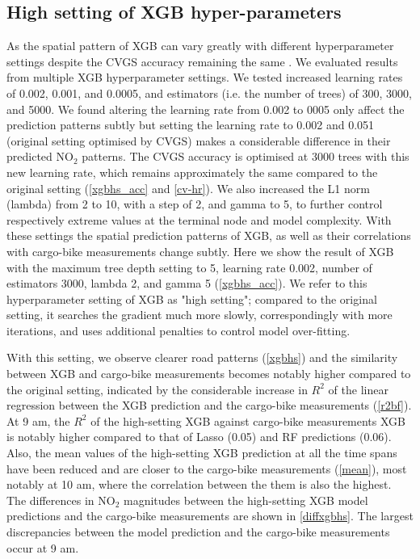 \documentclass{article}
\begin{document}
\subsection{High setting of XGB hyper-parameters}
As the spatial pattern of XGB can vary greatly with different hyperparameter settings despite the CVGS accuracy remaining the same \citep{luglobal}. We evaluated results from multiple XGB hyperparameter settings. We tested increased learning rates of 0.002, 0.001, and 0.0005, and estimators (i.e. the number of trees) of 300, 3000, and 5000. We found altering the learning rate from 0.002 to 0005 only affect the prediction patterns subtly but setting the learning rate to 0.002 and 0.051 (original setting optimised by CVGS) makes a considerable difference in their predicted NO$_2$ patterns. The CVGS accuracy is optimised at 3000 trees with this new learning rate, which remains approximately the same compared to the original setting (\cref{xgbhs_acc} and \cref{cv-hr}). We also increased the L1 norm (lambda) from 2 to 10, with a step of 2, and gamma \citep{chen2016xgboost} to 5, to further control respectively extreme values at the terminal node and model complexity. With these settings the spatial prediction patterns of XGB, as well as their correlations with cargo-bike measurements change subtly.  Here we show the result of XGB with the maximum tree depth setting to 5, learning rate 0.002, number of estimators 3000, lambda 2, and gamma 5 (\cref{xgbhs_acc}). We refer to this hyperparameter setting of XGB as "high setting"; compared to the original setting, it searches the gradient much more slowly, correspondingly with more iterations, and uses additional penalties to control model over-fitting. 

With this setting, we observe clearer road patterns (\cref{xgbhs}) and the similarity between XGB and cargo-bike measurements becomes notably higher compared to the original setting, indicated by the considerable increase in $R^2$ of the linear regression between the XGB prediction and the cargo-bike measurements (\cref{r2bf}). At 9 am, the $R^2$ of the high-setting XGB against cargo-bike measurements XGB is notably higher compared to that of Lasso (0.05) and RF predictions (0.06). Also, the mean values of the high-setting XGB prediction at all the time spans have been reduced and are closer to the cargo-bike measurements (\cref{mean}), most notably at 10 am, where the correlation between the them is also the highest. The differences in NO$_2$ magnitudes between the high-setting XGB model predictions and the cargo-bike measurements are shown in \cref{diffxgbhs}. The largest discrepancies between the model prediction and the cargo-bike measurements occur at 9 am. 
\end{document}
